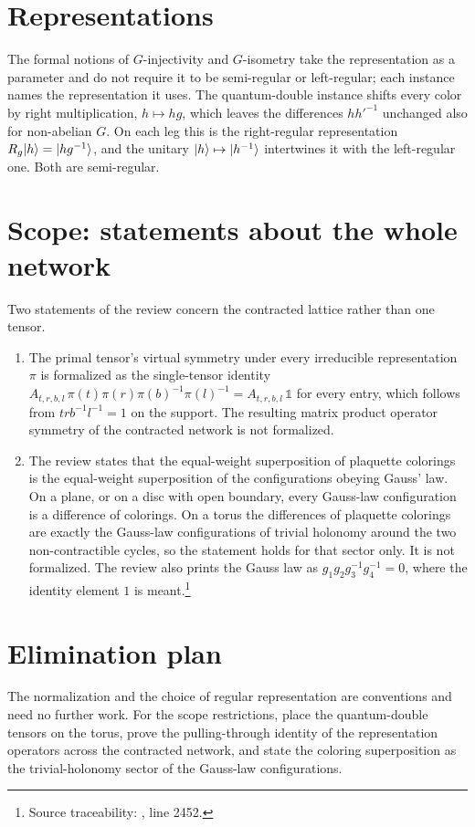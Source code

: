 \documentclass{article}
\begin{document}
\section{Representations}
The formal notions of $G$-injectivity and $G$-isometry take the
representation as a parameter and do not require it to be semi-regular
or left-regular; each instance names the representation it uses. The
quantum-double instance shifts every color by right multiplication,
$h\mapsto hg$, which leaves the differences $hh'^{-1}$ unchanged also for
non-abelian $G$. On each leg this is the right-regular representation
$R_g|h\rangle=|hg^{-1}\rangle$, and the unitary $|h\rangle\mapsto|h^{-1}\rangle$ intertwines it with the left-regular
one. Both are semi-regular.

\section{Scope: statements about the whole network}
Two statements of the review concern the contracted lattice rather than
one tensor.
\begin{enumerate}
    \item The primal tensor's virtual symmetry under every irreducible
    representation $\pi$ is formalized as the single-tensor identity
    $A_{t,r,b,l}\,\pi(t)\pi(r)\pi(b)^{-1}\pi(l)^{-1}=A_{t,r,b,l}\,\mathbb 1$
    for every entry, which follows from $trb^{-1}l^{-1}=1$ on the support.
    The resulting matrix product operator symmetry of the contracted
    network is not formalized.
    \item The review states that the equal-weight superposition of
    plaquette colorings is the equal-weight superposition of the
    configurations obeying Gauss' law. On a plane, or on a disc with open
    boundary, every Gauss-law configuration is a difference of colorings.
    On a torus the differences of plaquette colorings are exactly the
    Gauss-law configurations of trivial holonomy around the two
    non-contractible cycles, so the statement holds for that sector only.
    It is not formalized. The review also prints the Gauss law as
    $g_1g_2g_3^{-1}g_4^{-1}=0$, where the identity element $1$ is
    meant.\footnote{Source traceability:
        , line 2452.}
\end{enumerate}

\section{Elimination plan}
The normalization and the choice of regular representation are
conventions and need no further work. For the scope restrictions, place
the quantum-double tensors on the torus, prove the pulling-through
identity of the representation operators across the contracted network,
and state the coloring superposition as the trivial-holonomy sector of
the Gauss-law configurations.



\end{document}
